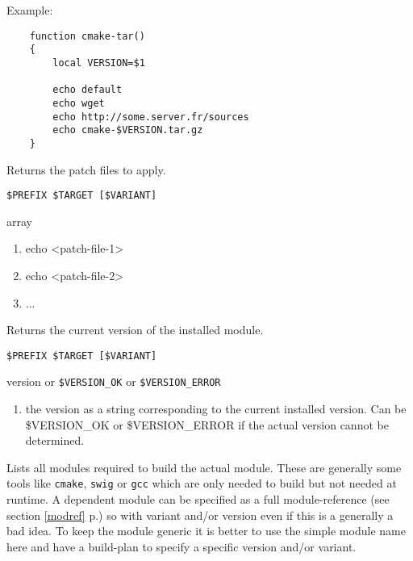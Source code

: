 \documentclass[a4paper,12pt,twoside]{article}
\newcommand{\code}[1]{\texttt{#1}}
\newcommand{\seeref}[1]{see section \ref{#1} p.\pageref{#1}}
\begin{document}
\begin{description}[font=\large\texttt]
	Example:
	\begin{lstlisting}
	function cmake-tar()
	{
		local VERSION=$1

		echo default
		echo wget
		echo http://some.server.fr/sources
		echo cmake-$VERSION.tar.gz
	}
	\end{lstlisting}

	\item[<module>-patches] Returns the patch files to apply.

	\begin{description}[font=\textit,style=standard]
		\item[parameter] \tabto{2cm} \code{\$PREFIX \$TARGET [\$VARIANT]}
		\item[return] \tabto{2cm} array
		\begin{enumerate}
			\item echo <patch-file-1>
			\item echo <patch-file-2>
			\item ...
		\end{enumerate}
	\end{description}

	\item[<module>-version] Returns the current version of the installed module.

	\begin{description}[font=\textit,style=standard]
		\item[parameter] \tabto{2cm} \code{\$PREFIX \$TARGET [\$VARIANT]}
		\item[return] \tabto{2cm} version or \code{\$VERSION\_OK} or \code{\$VERSION\_ERROR}
		\begin{enumerate}
			\item the version as a string corresponding to the current installed version. Can be \$VERSION\_OK or \$VERSION\_ERROR if the actual version cannot be determined.
		\end{enumerate}
	\end{description}

	\item[<module>-build-depends] Lists all modules required to build the actual module. These are generally some tools like \code{cmake}, \code{swig} or \code{gcc} which are only needed to build but not needed at runtime. A dependent module can be specified as a full module-reference (\seeref{modref}) so with variant and/or version even if this is a generally a bad idea. To keep the module generic it is better to use the simple module name here and have a build-plan to specify a specific version and/or variant.


\end{description}
\end{document}
